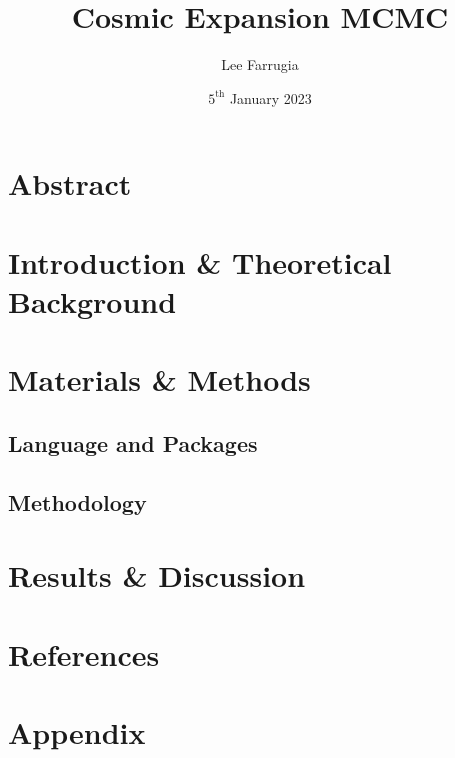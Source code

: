 \documentclass[12pt, a4paper]{article}
\title{Cosmic Expansion MCMC}
\date{\(5^\mathrm{{th}}\) January 2023}
\author{Lee Farrugia}
\begin{document}
    
\maketitle
\thispagestyle{titlepagestyle}
\pagestyle{mystyle}

\section{Abstract}

\section{Introduction \& Theoretical Background}

\section{Materials \& Methods}
    \subsection{Language and Packages}
    \subsection{Methodology}

\section{Results \& Discussion}

\section{References}
\printbibliography[heading = none]

\section{Appendix}
\begin{verbatim}

\end{verbatim}
\end{document}
